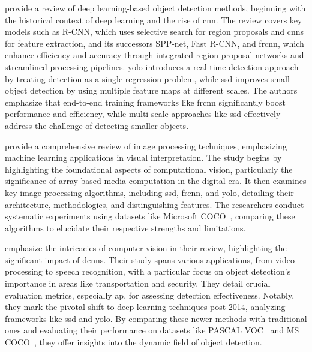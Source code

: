 \citet{rfc2} provide a review of deep learning-based object detection methods, 
beginning with the historical context of deep learning and the rise of \ac{cnn}. The review 
covers key models such as R-CNN, which uses selective search for region proposals and \ac{cnn}s for feature extraction, and 
its successors SPP-net, Fast R-CNN, and \ac{frcnn}, which enhance efficiency and accuracy through integrated region 
proposal networks and streamlined processing pipelines. \ac{yolo} introduces a real-time detection 
approach by treating detection as a single regression problem, while \ac{ssd} improves 
small object detection by using multiple feature maps at different scales. The authors emphasize that end-to-end 
training frameworks like \ac{frcnn} significantly boost performance and efficiency, while multi-scale approaches 
like \ac{ssd} effectively address the challenge of detecting smaller objects.

\citet{rfc8} provide a comprehensive review of image processing techniques, 
emphasizing machine learning applications in visual interpretation. The study begins by highlighting the 
foundational aspects of computational vision, particularly the significance of array-based media computation 
in the digital era. It then examines key image processing algorithms, including \ac{ssd}, \ac{frcnn}, and \ac{yolo}, 
detailing their architecture, methodologies, and distinguishing features. The researchers conduct systematic experiments 
using datasets like Microsoft COCO~\cite{rfc16}, comparing these algorithms to elucidate their respective strengths and 
limitations.

\citet{rfc9} emphasize the intricacies of computer vision in their review, highlighting 
the significant impact of \ac{dcnns}. Their study spans various applications, from video processing to speech 
recognition, with a particular focus on object detection's importance in areas like transportation and security. 
They detail crucial evaluation metrics, especially \ac{ap}, for assessing detection effectiveness. Notably, they 
mark the pivotal shift to deep learning techniques post-2014, analyzing frameworks like \ac{ssd} and \ac{yolo}. 
By comparing these newer methods with traditional ones and evaluating their performance on datasets like 
PASCAL VOC~\cite{rfc27} and MS COCO~\cite{rfc16}, they offer insights into the dynamic field of object detection.


